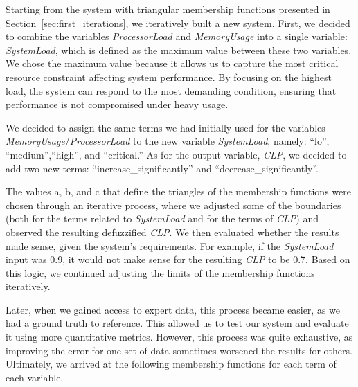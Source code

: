\documentclass[titlepage]{article}
\begin{document}
Starting from the system with triangular membership functions presented in Section~\ref{sec:first_iterations}, we iteratively built a new system.
First, we decided to combine the variables \textit{ProcessorLoad} and \textit{MemoryUsage} into a single variable: \textit{SystemLoad}, which is defined as the maximum value between these two variables. We chose the maximum value because it allows us to capture the most critical resource constraint affecting system performance. By focusing on the highest load, the system can respond to the most demanding condition, ensuring that performance is not compromised under heavy usage.


We decided to assign the same terms we had initially used for the variables \textit{MemoryUsage}/\textit{ProcessorLoad} to the new variable \textit{SystemLoad}, namely: ``lo'', ``medium'',``high'', and ``critical.'' As for the output variable, \textit{CLP}, we decided to add two new terms: ``increase\_significantly'' and ``decrease\_significantly''.

The values a, b, and c that define the triangles of the membership functions were chosen through an iterative process, where we adjusted some of the boundaries (both for the terms related to \textit{SystemLoad} and for the terms of \textit{CLP}) and observed the resulting defuzzified \textit{CLP}.
We then evaluated whether the results made sense, given the system's requirements. For example, if the \textit{SystemLoad} input was 0.9, it would not make sense for the resulting \textit{CLP} to be 0.7. Based on this logic, we continued adjusting the limits of the membership functions iteratively.

Later, when we gained access to expert data, this process became easier, as we had a ground truth to reference.
This allowed us to test our system and evaluate it using more quantitative metrics.
However, this process was quite exhaustive, as improving the error for one set of data sometimes worsened the results for others.
Ultimately, we arrived at the following membership functions for each term of each variable.
\end{document}
